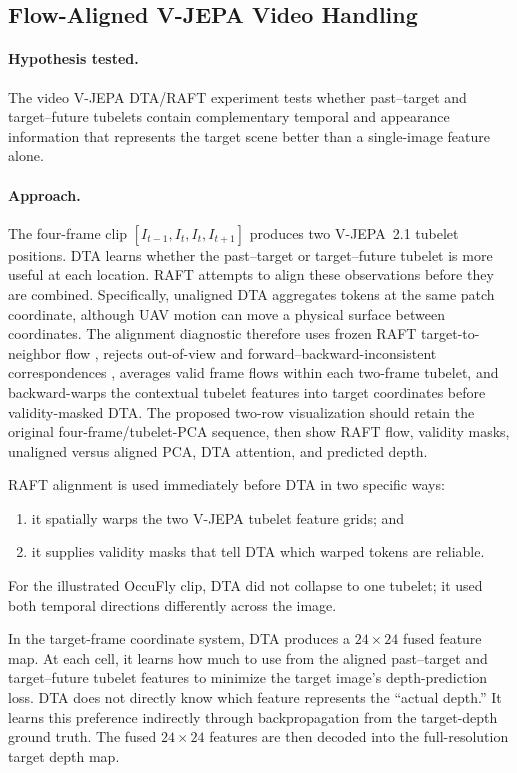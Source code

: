 \subsection*{Flow-Aligned V-JEPA Video Handling}
\paragraph{Hypothesis tested.}
The video V-JEPA DTA/RAFT experiment tests whether past--target and target--future tubelets contain complementary temporal and appearance information that represents the target scene better than a single-image feature alone.

\paragraph{Approach.}
The four-frame clip $[I_{t-1},I_t,I_t,I_{t+1}]$ produces two V-JEPA~2.1 tubelet positions. DTA learns whether the past--target or target--future tubelet is more useful at each location. RAFT attempts to align these observations before they are combined. Specifically, unaligned DTA aggregates tokens at the same patch coordinate, although UAV motion can move a physical surface between coordinates. The alignment diagnostic therefore uses frozen RAFT target-to-neighbor flow \cite{teed2020raft}, rejects out-of-view and forward--backward-inconsistent correspondences \cite{meister2018unflow}, averages valid frame flows within each two-frame tubelet, and backward-warps the contextual tubelet features into target coordinates before validity-masked DTA. The proposed two-row visualization should retain the original four-frame/tubelet-PCA sequence, then show RAFT flow, validity masks, unaligned versus aligned PCA, DTA attention, and predicted depth.

RAFT alignment is used immediately before DTA in two specific ways:
\begin{enumerate}
    \item it spatially warps the two V-JEPA tubelet feature grids; and
    \item it supplies validity masks that tell DTA which warped tokens are reliable.
\end{enumerate}

For the illustrated OccuFly clip, DTA did not collapse to one tubelet; it used both temporal directions differently across the image.

In the target-frame coordinate system, DTA produces a $24\times24$ fused feature map. At each cell, it learns how much to use from the aligned past--target and target--future tubelet features to minimize the target image's depth-prediction loss. DTA does not directly know which feature represents the ``actual depth.'' It learns this preference indirectly through backpropagation from the target-depth ground truth. The fused $24\times24$ features are then decoded into the full-resolution target depth map.

